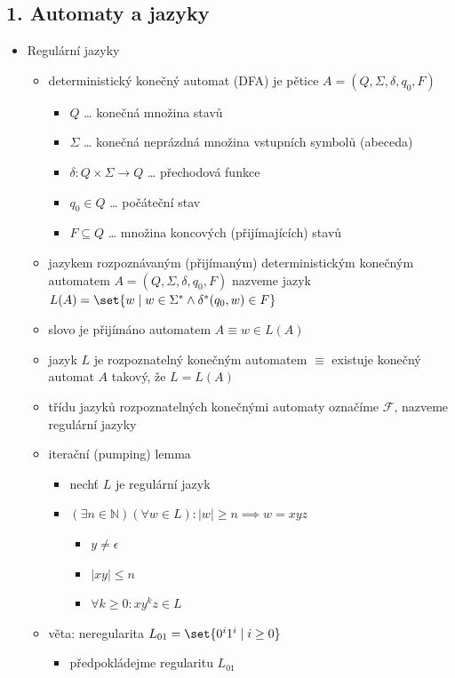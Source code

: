 \subsection{1. Automaty a jazyky}
\begin{itemize}
\item Regulární jazyky
\begin{itemize}
\item deterministický konečný automat (DFA) je pětice $A=(Q,\Sigma,\delta,q_0,F)$
\begin{itemize}
\item $Q$ \dots{} konečná množina stavů
\item $\Sigma$ \dots{} konečná neprázdná množina vstupních symbolů (abeceda)
\item $\delta:Q\times\Sigma\to Q$ \dots{} přechodová funkce
\item $q_0\in Q$ \dots{} počáteční stav
\item $F\subseteq Q$ \dots{} množina koncových (přijímajících) stavů
\end{itemize}
\item jazykem rozpoznávaným (přijímaným) deterministickým konečným automatem $A=(Q,\Sigma,\delta,q_0,F)$ nazveme jazyk $L(A)=\set{w\mid w\in\Sigma^*\land\delta^*(q_0,w)\in F}$
\item slovo je přijímáno automatem $A\equiv w\in L(A)$
\item jazyk $L$ je rozpoznatelný konečným automatem $\equiv$ existuje konečný automat $A$ takový, že $L=L(A)$
\item třídu jazyků rozpoznatelných konečnými automaty označíme $\mathcal F$, nazveme regulární jazyky
\item iterační (pumping) lemma
\begin{itemize}
\item nechť $L$ je regulární jazyk
\item $(\exists n\in\mathbb N)(\forall w\in L):|w|\geq n\implies w=xyz$
\begin{itemize}
\item $y\neq\epsilon$
\item $|xy|\leq n$
\item $\forall k\geq 0:xy^kz\in L$
\end{itemize}
\end{itemize}
\item věta: neregularita $L_{01}=\set{0^i1^i\mid i\geq 0}$
\begin{itemize}
\item předpokládejme regularitu $L_{01}$

\end{itemize}
\end{itemize}
\end{itemize}

